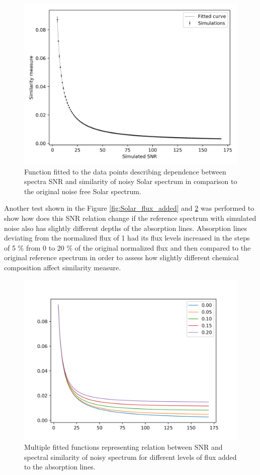 \begin{figure}
	\centering
	\includegraphics[width=\columnwidth]{canberra_b2_flux0_05.png}
	\caption{Function fitted to the data points describing dependence between spectra SNR and similarity of noisy Solar spectrum in comparison to the original noise free Solar spectrum.}
	\label{fig:similarity_snr}
\end{figure}

Another test shown in the Figure \ref{fig:Solar_flux_added} and \ref{fig:similarity_snr_flux} was performed to show how does this SNR relation change if the reference spectrum with simulated noise also has slightly different depths of the absorption lines. Absorption lines deviating from the normalized flux of 1 had its flux levels increased in the steps of 5 \% from 0 to 20 \% of the original normalized flux and then compared to the original reference spectrum in order to assess how slightly different chemical composition affect similarity measure.

\begin{figure}
	\centering
	\includegraphics[width=\columnwidth]{canberra_all_b1.png}
	\caption{Multiple fitted functions representing relation between SNR and spectral similarity of noisy spectrum for different levels of flux added to the absorption lines.}
	\label{fig:similarity_snr_flux}
\end{figure}

